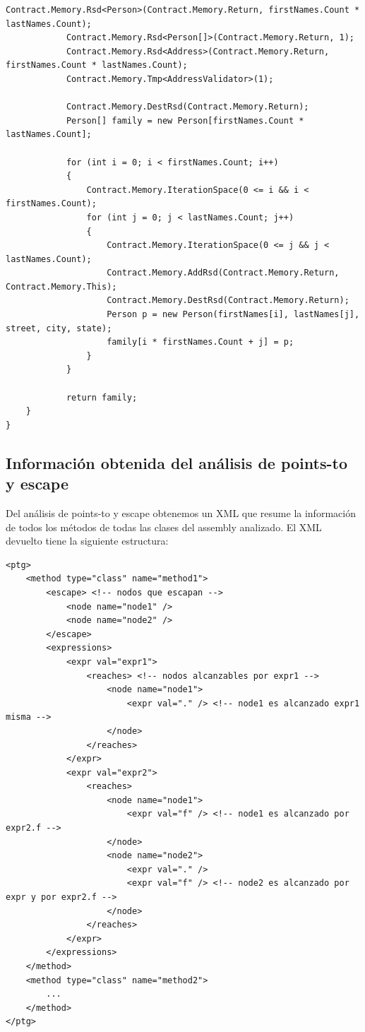 \documentclass[12pt,a4paper]{article}
\begin{document}
\begin{footnotesize}
\begin{lstlisting}[caption=Clase PeopleManager]
			Contract.Memory.Rsd<Person>(Contract.Memory.Return, firstNames.Count * lastNames.Count);
			Contract.Memory.Rsd<Person[]>(Contract.Memory.Return, 1);
			Contract.Memory.Rsd<Address>(Contract.Memory.Return, firstNames.Count * lastNames.Count);
			Contract.Memory.Tmp<AddressValidator>(1);

			Contract.Memory.DestRsd(Contract.Memory.Return);
			Person[] family = new Person[firstNames.Count * lastNames.Count];

			for (int i = 0; i < firstNames.Count; i++)
			{
				Contract.Memory.IterationSpace(0 <= i && i < firstNames.Count);
				for (int j = 0; j < lastNames.Count; j++)
				{
					Contract.Memory.IterationSpace(0 <= j && j < lastNames.Count);
					Contract.Memory.AddRsd(Contract.Memory.Return, Contract.Memory.This);
					Contract.Memory.DestRsd(Contract.Memory.Return);
					Person p = new Person(firstNames[i], lastNames[j], street, city, state);
					family[i * firstNames.Count + j] = p;
				}
			}

			return family;
	}
}
			\end{lstlisting}
			\end{footnotesize}

		\subsection{Información obtenida del análisis de points-to y escape} \label{sec:infopointsto}
			Del análisis de points-to y escape obtenemos un XML que resume la información de todos los métodos de todas las clases del assembly analizado. El XML devuelto tiene la siguiente estructura:

			\vspace{15pt}
			\begin{footnotesize}
			\begin{lstlisting}[caption=Ejemplo de XML del análisis de points-to y escape]
<ptg>
	<method type="class" name="method1">
		<escape> <!-- nodos que escapan -->
			<node name="node1" />
			<node name="node2" />
		</escape>
		<expressions>
			<expr val="expr1">
				<reaches> <!-- nodos alcanzables por expr1 -->
					<node name="node1">
						<expr val="." /> <!-- node1 es alcanzado expr1 misma -->
					</node>
				</reaches>
			</expr>
			<expr val="expr2">
				<reaches>
					<node name="node1">
						<expr val="f" /> <!-- node1 es alcanzado por expr2.f -->
					</node>
					<node name="node2">
						<expr val="." />
						<expr val="f" /> <!-- node2 es alcanzado por expr y por expr2.f -->
					</node>
				</reaches>
			</expr>
		</expressions>
	</method>
	<method type="class" name="method2">
		...
	</method>
</ptg>
			\end{lstlisting}
			\end{footnotesize}
\end{document}
